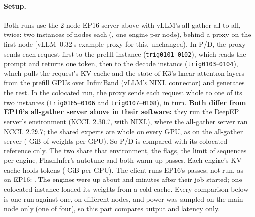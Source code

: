 \paragraph{Setup.} Both runs use the 2-node EP16 server above with vLLM's all-gather all-to-all, twice: two instances of \TriKpdInstNodes{} nodes each (\TriKpdLayout, one engine per node), behind a proxy on the first node (vLLM~0.32's example proxy for this, unchanged). In P/D, the proxy sends each request first to the prefill instance (\texttt{trig0101}--\texttt{0102}), which reads the prompt and returns one token, then to the decode instance (\texttt{trig0103}--\texttt{0104}), which pulls the request's KV cache and the state of K3's linear-attention layers from the prefill GPUs over InfiniBand (vLLM's NIXL connector) and generates the rest. In the colocated run, the proxy sends each request whole to one of its two instances (\texttt{trig0105}--\texttt{0106} and \texttt{trig0107}--\texttt{0108}), in turn. \textbf{Both differ from EP16's all-gather server above in their software:} they run the DeepEP server's environment (NCCL 2.30.7, with NIXL), where the all-gather server ran NCCL 2.29.7; the shared experts are whole on every GPU, as on the all-gather server (\TriKpdWeights{} GiB of weights per GPU). So P/D is compared with its colocated reference only. The two share that environment, the flags, the limit of \TriKpdMaxSeqs{} sequences per engine, FlashInfer's autotune and both warm-up passes. Each engine's KV cache holds \TriKpdKvTok{} tokens (\TriKpdKvGib{} GiB per GPU). The client runs EP16's passes; not run, as on EP16: \TriKpdNotRun. The engines were up about \TriKpdUp{} and \TriKpdUpCo{} minutes after their job started; one colocated instance loaded its weights from a cold cache. Every comparison below is one run against one, on different nodes, and power was sampled on the main node only (one of four), so this part compares output and latency only.

